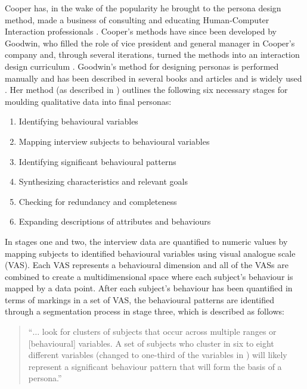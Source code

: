 Cooper has, in the wake of the popularity he brought to the persona design method, made a business of consulting and educating Human-Computer Interaction professionals \citep{Cooper2018}. Cooper's methods have since been developed by Goodwin, who filled the role of vice president and general manager in Cooper's company and, through several iterations, turned the methods into an interaction design curriculum \citep{Adlin2006}. Goodwin's method for designing personas is performed manually and has been described in several books and articles \citep{Goodwin2009,Cooper2007,Goodwin2002} and is widely used \citep{Kerr2014a, Calde2002, Antle2006, Christidis2011}. Her method (as described in \citep{Cooper2007}) outlines the following six necessary stages for moulding qualitative data into final personas:
\begin{enumerate}
\item Identifying behavioural variables
\item Mapping interview subjects to behavioural variables
\item Identifying significant behavioural patterns
\item Synthesizing characteristics and relevant goals
\item Checking for redundancy and completeness
\item Expanding descriptions of attributes and behaviours
\end{enumerate}
In stages one and two, the interview data are quantified to numeric values by mapping subjects to identified behavioural variables using visual analogue scale (VAS). Each VAS represents a behavioural dimension and all of the VASs are combined to create a multidimensional space where each subject's behaviour is mapped by a data point. After each subject's behaviour has been quantified in terms of markings in a set of VAS, the behavioural patterns are identified through a segmentation process in stage three, which is described as follows\citep{Cooper2007}:
\begin{quote}
``$\dotsc$ look for clusters of subjects that occur across multiple ranges or [behavioural] variables. A set of subjects who cluster in six to eight different variables (changed to one-third of the variables in \citep{Goodwin2009}) will likely represent a significant behaviour pattern that will form the basis of a persona.''\end{quote}

